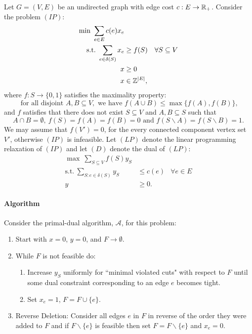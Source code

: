 \documentclass[letterpaper,12pt,oneside,onecolumn]{article}
\newcommand{\cA}{\mathcal{A}} \newcommand{\cB}{\mathcal{B}}
\begin{document}
\section{}
\paragraph{}
Let $G = (V,E)$ be an undirected graph with edge cost $c: E\rightarrow \mathbb{R}_+$. Consider the problem $(IP)$:
\begin{align*}
\min\ \sum_{e\in E} c(e) x_e&\\
\text{s.t.}\  \sum_{e\in\delta(S)} x_e &\geq f(S) &\forall S \subseteq V \\
x&\geq 0\\
x&\in \mathbb{Z}^{|E|},
\end{align*}
where $f : S \rightarrow \{0,1\}$ satisfies the maximality property:
$$\text{ for all disjoint } A,B\subseteq V, \text{ we have } f(A \cup B ) \leq \max\{f(A), f(B)\},$$
and $f$ satisfies that there does not exist $S \subseteq V$ and $A, B \subseteq S$ such that
\begin{equation}\label{eq:1}
A\cap B = \emptyset,\ f(S)=f(A)=f(B)=0 \text{ and } f(S\backslash A) = f(S\backslash B) = 1.
\end{equation}
We may assume that $f(V') = 0$, for the every connected component vertex set $V'$, otherwise $(IP)$ is infeasible. Let $(LP)$ denote the linear programming relaxation of $(IP)$ and let $(D)$ denote the dual of $(LP)$:
\begin{align*}
\max\ \sum_{S\subseteq V} f(S) y_S&\\
\text{s.t.}\ \sum_{S : e \in \delta(S)} y_S &\leq c(e) &\forall e \in E \\
y&\geq 0. 
\end{align*}
\paragraph{Algorithm}
Consider the primal-dual algorithm, $\cA$, for this problem:
\begin{enumerate}
\item Start with $x=0$, $y=0$, and $F \rightarrow \emptyset$.
\item While $F$ is not feasible do:
	\begin{enumerate}
	\item Increase $y_S$ uniformly for ``minimal violated cuts" with respect to $F$ until some dual constraint corresponding to an edge $e$ becomes tight.
	\item Set $x_e = 1$, $F = F\cup \{e\}$.
	\end{enumerate}
\item Reverse Deletion: Consider all edges $e$ in $F$ in reverse of the order they were added to $F$ and if $F\backslash \{e\}$ is feasible then set $F = F\backslash\{e\}$ and $x_e = 0$.
\end{enumerate}
\end{document}

